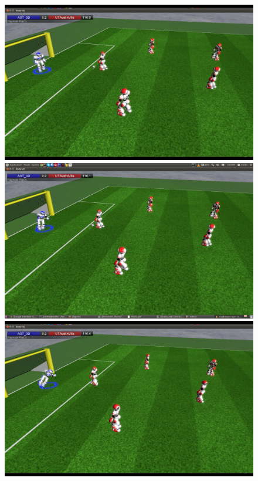\begin{figure}[t!] 
\centering    
	\includegraphics[trim = 5cm 10cm 30cm 5cm, clip,scale=0.25]{Chapter3/figures/GoalieFall.png}
	\includegraphics[trim = 5cm 10cm 30cm 5cm, clip,scale=0.25]{Chapter3/figures/GoalieFall2.png}
	\includegraphics[trim = 5cm 10cm 30cm 5cm, clip,scale=0.25]{Chapter3/figures/GoalieFall3.png}

\end{figure}
